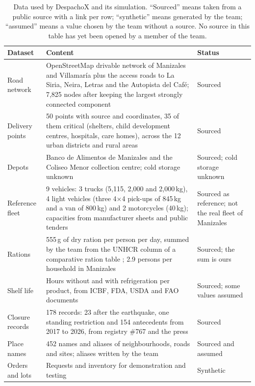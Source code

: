 \documentclass[11pt]{article}
\begin{document}
\begin{table}[ht]
\centering
\small
\caption{Data used by DespachoX and its simulation. ``Sourced'' means taken from a public source with a link per row; ``synthetic'' means generated by the team; ``assumed'' means a value chosen by the team without a source. No source in this table has yet been opened by a member of the team.}
\label{tab:data}
\begin{tabularx}{\linewidth}{L{3.3cm} Y L{2.6cm}}
\toprule
Dataset & Content & Status \\
\midrule
Road network & OpenStreetMap drivable network of Manizales and Villamaría plus the access roads to La Siria, Neira, Letras and the Autopista del Café; 7,825 nodes after keeping the largest strongly connected component \citep{boeing2017osmnx} & Sourced \\
Delivery points & 50 points with source and coordinates, 35 of them critical (shelters, child development centres, hospitals, care homes), across the 12 urban districts and rural areas & Sourced \\
Depots & Banco de Alimentos de Manizales and the Coliseo Menor collection centre; cold storage unknown & Sourced; cold storage unknown \\
Reference fleet & 9 vehicles: 3 trucks (5,115, 2,000 and 2,000\,kg), 4 light vehicles (three 4$\times$4 pick-ups of 845\,kg and a van of 800\,kg) and 2 motorcycles (40\,kg); capacities from manufacturer sheets and public tenders & Sourced as reference; not the real fleet of Manizales \\
Rations & 555\,g of dry ration per person per day, summed by the team from the UNHCR column of a comparative ration table \citep{logcluster_commodities}; 2.9 persons per household in Manizales \citep{dane2019manizales} & Sourced; the sum is ours \\
Shelf life & Hours without and with refrigeration per product, from ICBF, FDA, USDA and FAO documents & Sourced; some values assumed \\
Closure records & 178 records: 23 after the earthquake, one standing restriction and 154 antecedents from 2017 to 2026, from registry \#767 and the press \citep{invias767} & Sourced \\
Place names & 452 names and aliases of neighbourhoods, roads and sites; aliases written by the team & Sourced and assumed \\
Orders and lots & Requests and inventory for demonstration and testing & Synthetic \\
\bottomrule
\end{tabularx}
\end{table}
\end{document}
